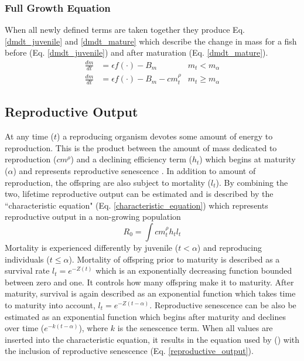 \documentclass[a4paper, 11pt, hidelinks]{article} %
\begin{document}
	\subsubsection{Full Growth Equation}
	When all newly defined terms are taken together they produce Eq. \ref{dmdt_juvenile}  and \ref{dmdt_mature} which describe the change in mass for a fish before (Eq. \ref{dmdt_juvenile}) and after maturation (Eq. \ref{dmdt_mature}).
	\begin{align}
		\label{dmdt_juvenile}
		\frac{dm}{dt} &= \epsilon f(\cdot) - B_m & m_t < m_\alpha \\
		\label{dmdt_mature}
		\frac{dm}{dt} &= \epsilon f(\cdot) - B_m - cm_t^\rho & m_t \geq m_\alpha
	\end{align}

	
	
	\subsection{Reproductive Output}
	At any time ($ t $) a reproducing organism devotes some amount of energy to reproduction.  This is the product between the amount of mass dedicated to reproduction ($ cm^\rho $) and a declining efficiency term ($ h_t $) which begins at maturity ($ \alpha $) and represents reproductive senescence \parencite{Benoit2018, Vrtilek2018, Stearns2000}.  In addition to amount of reproduction, the offspring are also subject to mortality ($ l_t $).  By combining the two, lifetime reproductive output can be estimated and is described by the ``characteristic equation" (Eq. \ref{characteristic_equation}) which represents reproductive output in a non-growing population \parencite{Tsoukali2016, roff1993, Roff2001, stearns1992evolution, Arendt2011, Roff1986, Roff1984}
	\begin{equation}
		\label{characteristic_equation}
		R_0 = \int c m_t^\rho h_t l_t 
	\end{equation}
	Mortality is experienced differently by juvenile ($ t < \alpha $) and reproducing individuals ($ t \leq \alpha $). %
	Mortality of offspring prior to maturity is described as a survival rate $ l_t = e^{-Z(t)} $ which is an exponentially decreasing function bounded between zero and one.  It controls how many offspring make it to maturity.  After maturity, survival is again described as an exponential function which takes time to maturity into account, $ l_t = e^{-Z(t-\alpha)} $.  
	Reproductive senescence can be also be estimated as an exponential function which begins after maturity and declines over time  ($ e^{-k(t-\alpha)} $), where $ k $ is the senescence term.  When all values are inserted into the characteristic equation, it results in the equation used by \citeauthor{Charnov2001} (\citeyear{Charnov2001}) with the inclusion of reproductive senescence (Eq. \ref{reproductive_output}).
\end{document}
